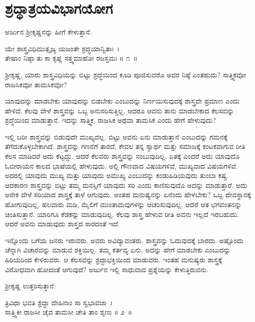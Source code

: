 
\chapter{ಶ್ರದ್ಧಾತ್ರಯವಿಭಾಗಯೋಗ}

ಅರ್ಜುನ ಶ‍್ರೀಕೃಷ್ಣನನ್ನು ಹೀಗೆ ಕೇಳುತ್ತಾನೆ.

\begin{shloka}
ಯೇ ಶಾಸ್ತ್ರವಿಧಿಮುತ್ಸೃಜ್ಯ ಯಜಂತೇ ಶ್ರದ್ಧಯಾನ್ವಿತಾಃ~।\\ತೇಷಾಂ ನಿಷ್ಠಾ ತು ಕಾ ಕೃಷ್ಣ ಸತ್ತ್ವಮಾಹೋ ರಜಸ್ತಮಃ \hfill॥ ೧~॥
\end{shloka}

\begin{artha}
ಶ‍್ರೀಕೃಷ್ಣ, ಯಾರು ಶಾಸ್ತ್ರವಿಧಿಯನ್ನು ಬಿಟ್ಟು ಶ್ರದ್ಧೆಯಿಂದ ಕೂಡಿ ಪೂಜಿಸುವರೊ ಅವರ ನಿಷ್ಠೆ ಎಂತಹುದು? ಸಾತ್ತ್ವಿಕವೋ ರಾಜಸಿಕವೋ ತಾಮಸಿಕವೋ?
\end{artha}

ಯಾವುದನ್ನು ಮಾಡಬೇಕು ಯಾವುದನ್ನು ಬಿಡಬೇಕು ಎಂಬುದನ್ನು ನಿರ್ಣಯಿಸುವುದಕ್ಕೆ ಶಾಸ್ತ್ರವೇ ಪ್ರಮಾಣ ಎಂದು ಹೇಳಿದೆ. ಕೆಲವು ವೇಳೆ ಶಾಸ್ತ್ರವನ್ನು ಒಬ್ಬ ಅನುಸರಿಸುತ್ತಿಲ್ಲ. ಆದರೂ ಆವನು ತಾನು ಮಾಡಬೇಕಾದ ಕೆಲಸವನ್ನು ಶ್ರದ್ಧೆಯಿಂದ ಮಾಡುತ್ತಾನೆ. ಇದನ್ನು ಸಾತ್ತ್ವಿಕ, ರಾಜಸಿಕ ಅಥವಾ ತಾಮಸಿಕ ಎಂದು ಹೇಗೆ ಹೇಳುವುದು?

ಇಲ್ಲಿ ಬರೀ ಶಾಸ್ತ್ರವನ್ನು ಬಿಡುವುದೇ ಮುಖ್ಯವಲ್ಲ. ಬಿಟ್ಟು ಅವನು ಏನು ಮಾಡುತ್ತಾನೆ ಎಂಬುದನ್ನು ಗಮನಕ್ಕೆ ತೆಗೆದುಕೊಳ್ಳಬೇಕಾಗಿದೆ. ಶಾಸ್ತ್ರವನ್ನು ಗಣನೆಗೆ ತಾರದೆ, ಕೇವಲ ತನ್ನ ಸ್ವಾರ್ಥ ಮತ್ತು ಸಮಾಜಕ್ಕೆ ಕಂಟಕವಾಗುವ ರೀತಿ ಕೆಲಸ ಮಾಡಿದರೆ ಅದು ಕೆಟ್ಟದ್ದು. ಆದರೆ ಕೆಲವರು ಶಾಸ್ತ್ರವನ್ನು ನಂಬುವುದಿಲ್ಲ. ಏತಕ್ಕೆ ಎಂದರೆ ಅದು ಯಾವುದೊ ಓಬೀರಾಯನ ಕಾಲದ ಭಾಷೆಯಲ್ಲಿ ಹೇಳುವುದು. ಅಲ್ಲಿ ಗೌಣವಾದ ವಿಷಯಗಳಿವೆ, ಮುಖ್ಯವಾದ ವಿಷಯಗಳಿವೆ. ಅದರಲ್ಲಿ ಯಾವುದು ಮುಖ್ಯ ಮತ್ತು ಯಾವುದು ಅಮುಖ್ಯ ಎಂಬುದನ್ನು ಕಂಡುಹಿಡಿಯವುದು ತುಂಬಾ ಕಷ್ಚ. ಆದಕಾರಣ ಶಾಸ್ತ್ರವನ್ನು ಬಿಟ್ಟು ತಮ್ಮ ಮನಸ್ಸಿಗೆ ಯಾವುದು ಸರಿ ಎಂದು ಕಾಣಿಸುವುದೊ ಅದನ್ನು ಮಾಡುತ್ತಾರೆ. ಅದು ಅನೇಕ ವೇಳೆ ಸರಿಯಾದ ಶಾಸ್ತ್ರಕ್ಕೆ ತಾಳೆ ಆಗುವುದು. ಅಂತಹ ಮನುಷ್ಯನನ್ನು ಏನೆಂದು ಹೇಳಬೇಕು? ಒಬ್ಬ ದೇವಸ್ಥಾನಕ್ಕೆ ಹೋಗುವುದಿಲ್ಲ, ಹಲವಾರು ಮಡಿ, ಮೈಲಿಗೆ ಮುಂತಾದುವುಗಳನ್ನು ಆಚರಿಸುವುದಿಲ್ಲ. ಆದರೆ ಆತ ಭಗವಂತನನ್ನು ಚಿಂತಿಸುತ್ತಾನೆ. ಯಾರಿಗೂ ಕೆಡಕನ್ನು ಮಾಡುವುದಿಲ್ಲ. ಕೆಲವು ಶಾಸ್ತ್ರ ಹೇಳುವ ರೀತಿ ಅವನು ಇಲ್ಲದೆ ಇರಬಹುದು. ಆದರೆ ಅವನು ಮಾಡುವುದು ಶಾಸ್ತ್ರದ ಸಾರದಂತೆ ಇದೆ.

ಇನ್ನೊಂದು ಬಗೆಯ ಜನರು ಇರುವರು. ಅವರು ಅವಿದ್ಯಾವಂತರು. ಶಾಸ್ತ್ರವನ್ನು ಓದುವುದಕ್ಕೆ ಬಾರದು. ಅಷ್ಟೊಂದು ಚೆನ್ನಾಗಿ ವಿಚಾರವನ್ನು ಮಾಡುವ ಶಕ್ತಿಯಿಲ್ಲ. ತಮ್ಮ ಕರ್ತವ್ಯ ಏನು, ಅದನ್ನು ಹೇಗೆ ಮಾಡಬೇಕು ಎಂಬುದನ್ನು ಹಿರಿಯರಿಂದ ಕೇಳಿರುವರು. ಆ ಕೆಲಸವನ್ನು ಶ್ರದ್ಧಾಭಕ್ತಿಯಿಂದ ಮಾಡುವರು. ಇಂತಹ ಮನುಷ್ಯರು ಶಾಸ್ತ್ರಕ್ಕೆ ವಿರೋಧವಾಗಿ ಹೋದಂತೆ ಆಗುವುದೆ? ಅರ್ಜುನ ಇಲ್ಲಿ ಸಾಧುವಾದ ಪ್ರಶ್ನೆಯನ್ನು ಕೇಳುತ್ತಿರುವನು.

ಶ‍್ರೀಕೃಷ್ಣ ಉತ್ತರಿಸುತ್ತಾನೆ:

\begin{shloka}
ತ್ರಿವಿಧಾ ಭವತಿ ಶ್ರದ್ಧಾ ದೇಹಿನಾಂ ಸಾ ಸ್ವಭಾವಜಾ~।\\ಸಾತ್ತ್ವಿಕೀ ರಾಜಸೀ ಚೈವ ತಾಮಸೀ ಚೇತಿ ತಾಂ ಶೃಣು \hfill॥ ೨~॥
\end{shloka}

